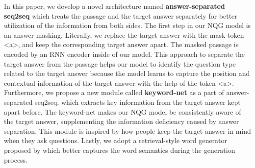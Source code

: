 \documentclass[letterpaper]{article} %
\newcommand{\kj}[1]{\textcolor{red}{#1}}
\begin{document}
In this paper, we develop a novel architecture named \textbf{answer-separated seq2seq} which treats the passage and the target answer separately for better utilization of the information from both sides. The first step in our NQG model is an answer masking. Literally, we replace the target answer with the mask token \textless a\textgreater{}, and keep the corresponding target answer apart. The masked passage is encoded by an RNN encoder inside of our model. This approach to separate the target answer from the passage helps our model to identify the question type related to the target answer because the model learns to capture the position and contextual information of the target answer with the help of the token \textless a\textgreater{}. Furthermore, we propose a new module called \textbf{keyword-net} as a part of answer-separated seq2seq, which extracts key information from the target answer kept apart before. The keyword-net makes our NQG model be consistently aware of the target answer, supplementing the information deficiency caused by answer separation. This module is inspired by how people keep the target answer in mind when they ask questions. Lastly, we adopt a retrieval-style word generator proposed by \cite{ma2018query} which better captures the word semantics during the generation process.
% 
% 
% 
\end{document}
